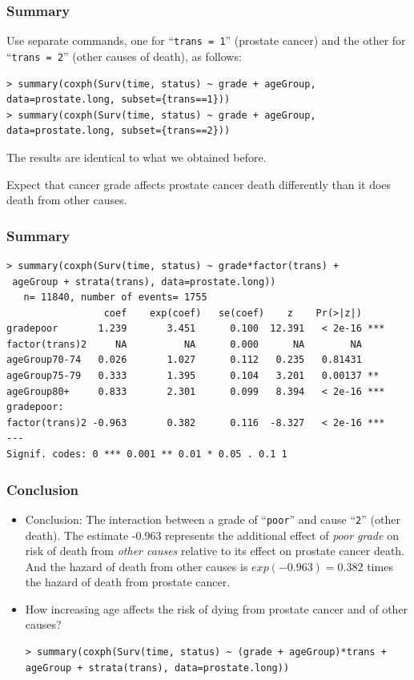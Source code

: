 \documentclass{beamer}
\newcommand{\empr}[1]{{\emph{\color{red}#1}}}
\begin{document}
\pagebreak
\begin{frame}[fragile]
\frametitle{Summary}
\begin{itemize}
\item {\footnotesize Use separate commands, one for ``\texttt{trans = 1}'' (prostate cancer) and the other for ``\texttt{trans = 2}'' (other causes of death), as follows:}
\begin{Verbatim}
> summary(coxph(Surv(time, status) ~ grade + ageGroup,
data=prostate.long, subset={trans==1}))
> summary(coxph(Surv(time, status) ~ grade + ageGroup,
data=prostate.long, subset={trans==2}))
\end{Verbatim}  
\item {\footnotesize The results are identical to what we obtained before.
\item Expect that cancer grade affects prostate cancer death differently than it does death from other causes.}
\end{itemize}
\end{frame}

\pagebreak
\begin{frame}[fragile]
\frametitle{Summary}
\begin{itemize}
\begin{Verbatim}
> summary(coxph(Surv(time, status) ~ grade*factor(trans) +
 ageGroup + strata(trans), data=prostate.long))
   n= 11840, number of events= 1755
                 coef    exp(coef)   se(coef)    z    Pr(>|z|)
gradepoor       1.239       3.451      0.100  12.391   < 2e-16 ***
factor(trans)2     NA          NA      0.000      NA        NA    
ageGroup70-74   0.026       1.027      0.112   0.235   0.81431
ageGroup75-79   0.333       1.395      0.104   3.201   0.00137 ** 
ageGroup80+     0.833       2.301      0.099   8.394   < 2e-16 ***
gradepoor: 
factor(trans)2 -0.963       0.382      0.116  -8.327   < 2e-16 ***
---
Signif. codes: 0 *** 0.001 ** 0.01 * 0.05 . 0.1 1
\end{Verbatim} 
\end{itemize}
\end{frame}

\pagebreak
\begin{frame}[fragile]
\frametitle{Conclusion}
\begin{itemize}
\item Conclusion: The  interaction between a grade of ``\texttt{poor}'' and cause ``\texttt{2}'' (other death). The estimate -0.963 represents the additional effect of \empr{poor grade} on risk of death from \empr{other causes} relative to its effect on prostate cancer death. And the hazard of death from other causes is $exp(-0.963) = 0.382$ times the hazard of death from prostate cancer.
\item How increasing age affects the risk of dying from prostate cancer and of other causes?
\begin{Verbatim}
> summary(coxph(Surv(time, status) ~ (grade + ageGroup)*trans +
ageGroup + strata(trans), data=prostate.long))
\end{Verbatim}  
\end{itemize}
\end{frame}
\end{document}
